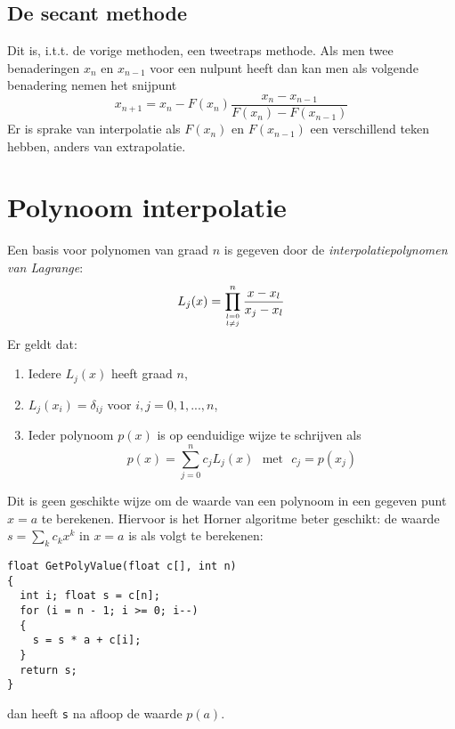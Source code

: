 \subsection{De secant methode}
Dit is, i.t.t. de vorige methoden, een tweetraps methode. Als men twee
benaderingen $x_n$ en $x_{n-1}$ voor een nulpunt heeft dan kan men als
volgende benadering nemen het snijpunt
\[
x_{n+1}=x_n-F(x_n)\frac{x_n-x_{n-1}}{F(x_n)-F(x_{n-1})}
\]
Er is sprake van interpolatie als $F(x_n)$ en $F(x_{n-1})$ een verschillend
teken hebben, anders van extrapolatie.

\section{Polynoom interpolatie}
Een basis voor polynomen van graad $n$ is gegeven door de
{\it interpolatiepolynomen van Lagrange}:
\[
L_j(x)=\prod_{{l=0}\atop{l\neq j}}^n\frac{x-x_l}{x_j-x_l}
\]
Er geldt dat:
\begin{enumerate}
\item Iedere $L_j(x)$ heeft graad $n$,
\item $L_j(x_i)=\delta_{ij}$ voor $i,j=0,1,...,n$,
\item Ieder polynoom $p(x)$ is op eenduidige wijze te schrijven als
\[
p(x)=\sum_{j=0}^n c_jL_j(x)~~~\mbox{met}~~~c_j=p(x_j)
\]
\end{enumerate}
Dit is geen geschikte wijze om de waarde van een polynoom in een gegeven punt
$x=a$ te berekenen. Hiervoor is het Horner algoritme beter geschikt: de
waarde $s=\sum_k c_kx^k$ in $x=a$ is als volgt te berekenen:
\begin{verbatim}
float GetPolyValue(float c[], int n)
{
  int i; float s = c[n];
  for (i = n - 1; i >= 0; i--)
  {
    s = s * a + c[i];
  }
  return s;
}
\end{verbatim}
dan heeft {\tt s} na afloop de waarde $p(a)$.

